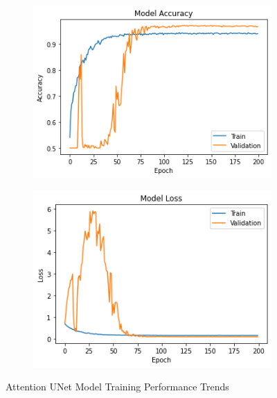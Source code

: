 \begin{figure}[H]
        \begin{subfigure}[b]{0.5\textwidth}
                \includegraphics[width=\linewidth]{Images/AttUNetAccuracy.png}
        \end{subfigure}%
        \begin{subfigure}[b]{0.5\textwidth}
                \includegraphics[width=\linewidth]{Images/AttUNetLoss.png}
        \end{subfigure}%
        \caption{Attention UNet Model Training Performance Trends}\label{fig:attunetModelTraining}
\end{figure}


